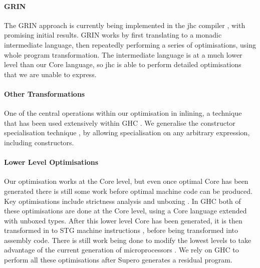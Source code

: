 \documentclass{llncs}
\begin{document}
\paragraph{GRIN} The GRIN approach \cite{grin} is currently being implemented in the jhc compiler \cite{jhc}, with promising initial results. GRIN works by first translating to a monadic intermediate language, then repeatedly performing a series of optimisations, using whole program transformation. The intermediate language is at a much lower level than our Core language, so jhc is able to perform detailed optimisations that we are unable to express.

\paragraph{Other Transformations} One of the central operations within our optimisation in inlining, a technique that has been used extensively within GHC \cite{spj:inlining}. We generalise the constructor specialisation technique \cite{spj:specconstr}, by allowing specialisation on any arbitrary expression, including constructors.

\begin{comment}
One optimisation we do not currently support is the use of user provided transformation rules \cite{spj:rules}, which can be used to automatically replace certain expressions with others -- for example |sort . nub| removes duplicates then sorts a list, but can be done asymptotically faster in a single operation.
\end{comment}

\paragraph{Lower Level Optimisations} Our optimisation works at the Core level, but even once optimal Core has been generated there is still some work before optimal machine code can be produced. Key optimisations include strictness analysis and unboxing \cite{spj:unboxing}. In GHC both of these optimisations are done at the Core level, using a Core language extended with unboxed types. After this lower level Core has been generated, it is then transformed in to STG machine instructions \cite{spj:stg}, before being transformed into assembly code. There is still work being done to modify the lowest levels to take advantage of the current generation of microprocessors \cite{marlow:pointer_tagging}. We rely on GHC to perform all these optimisations after Supero generates a residual program.
\end{document}
